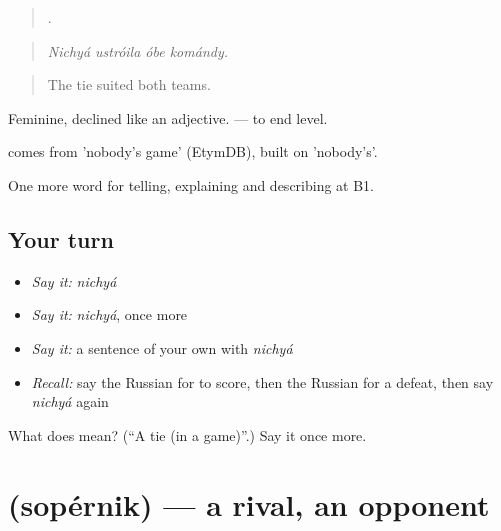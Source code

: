 \begin{quote}
   .
\end{quote}

\begin{quote}
\emph{Nichyá ustróila óbe komándy.}
\end{quote}

\begin{quote}
The tie suited both teams.
\end{quote}

Feminine, declined like an adjective. \emph{ } — to end level.

\begin{cousinweb}
\emph{} comes from \emph{ } 'nobody's game' (EtymDB), built on \emph{} 'nobody's'.
\end{cousinweb}

\begin{grammarlens}[title={What you've built}]
One more word for telling, explaining and describing at B1.
\end{grammarlens}

\subsection*{Your turn}
\begin{itemize}
\raggedright
  \item \emph{Say it:} \emph{nichyá}
  \item \emph{Say it:} \emph{nichyá}, once more
  \item \emph{Say it:} a sentence of your own with \emph{nichyá}
  \item \emph{Recall:} say the Russian for to score, then the Russian for a defeat, then say \emph{nichyá} again
\end{itemize}

\begin{tcolorbox}[breakable,colback=teal!4,colframe=teal!35!black,title={Before you move on}]
What does  mean? (\textquotedblleft{}A tie (in a game)\textquotedblright{}.) Say it once more.
\end{tcolorbox}
\section[\texorpdfstring{\ru{соперник} (sopérnik)}{соперник (sopérnik)}]{ (sopérnik) — a rival, an opponent}

\label{lesson:RU-C510-sopernik}



